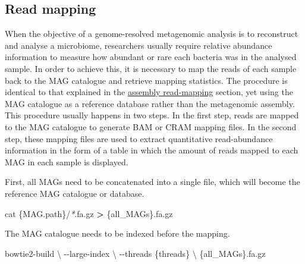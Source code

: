 \documentclass[
]{book}
\newenvironment{Shaded}{\begin{snugshade}}{\end{snugshade}}
\newcommand{\AttributeTok}[1]{\textcolor[rgb]{0.77,0.63,0.00}{#1}}
\newcommand{\DataTypeTok}[1]{\textcolor[rgb]{0.13,0.29,0.53}{#1}}
\newcommand{\ExtensionTok}[1]{#1}
\newcommand{\FunctionTok}[1]{\textcolor[rgb]{0.00,0.00,0.00}{#1}}
\newcommand{\NormalTok}[1]{#1}
\newcommand{\OperatorTok}[1]{\textcolor[rgb]{0.81,0.36,0.00}{\textbf{#1}}}
\newcommand{\PreprocessorTok}[1]{\textcolor[rgb]{0.56,0.35,0.01}{\textit{#1}}}
\begin{document}
\hypertarget{genome-resolved-mapping}{%
\subsection*{Read mapping}\label{genome-resolved-mapping}}

When the objective of a genome-resolved metagenomic analysis is to reconstruct and analyse a microbiome, researchers usually require relative abundance information to measure how abundant or rare each bacteria was in the analysed sample. In order to achieve this, it is necessary to map the reads of each sample back to the MAG catalogue and retrieve mapping statistics. The procedure is identical to that explained in the \protect\hyperlink{assembly-read-mapping}{assembly read-mapping} section, yet using the MAG catalogue as a reference database rather than the metagenomic assembly. This procedure usually happens in two steps. In the first step, reads are mapped to the MAG catalogue to generate BAM or CRAM mapping files. In the second step, these mapping files are used to extract quantitative read-abundance information in the form of a table in which the amount of reads mapped to each MAG in each sample is displayed.

First, all MAGs need to be concatenated into a single file, which will become the reference MAG catalogue or database.
\small

\begin{Shaded}
\begin{Highlighting}[]
\FunctionTok{cat}\NormalTok{ \{MAG.path\}/}\PreprocessorTok{*}\NormalTok{.fa.gz }\OperatorTok{\textgreater{}}\NormalTok{ \{all\_MAGs\}.fa.gz}
\end{Highlighting}
\end{Shaded}

\normalsize

The MAG catalogue needs to be indexed before the mapping.
\small

\begin{Shaded}
\begin{Highlighting}[]
\ExtensionTok{bowtie2{-}build} \DataTypeTok{\textbackslash{}}
      \AttributeTok{{-}{-}large{-}index} \DataTypeTok{\textbackslash{}}
      \AttributeTok{{-}{-}threads}\NormalTok{ \{threads\} }\DataTypeTok{\textbackslash{}}
\NormalTok{       \{all\_MAGs\}.fa.gz}
\end{Highlighting}
\end{Shaded}

\normalsize
\end{document}
